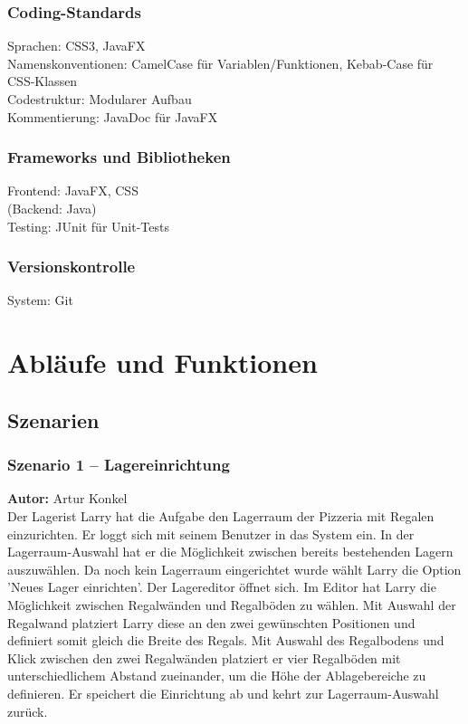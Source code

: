 \subsubsection*{Coding-Standards}
Sprachen: CSS3, JavaFX\\
Namenskonventionen: CamelCase für Variablen/Funktionen, Kebab-Case für CSS-Klassen\\
Codestruktur: Modularer Aufbau\\
Kommentierung: JavaDoc für JavaFX

\subsubsection*{Frameworks und Bibliotheken}
Frontend: JavaFX, CSS\\
(Backend: Java)\\
Testing: JUnit für Unit-Tests

\subsubsection*{Versionskontrolle}
System: Git

\section{Abläufe und Funktionen}

\subsection{Szenarien}

\subsubsection{Szenario 1 – Lagereinrichtung}
\textbf{Autor:} Artur Konkel\\
Der Lagerist Larry hat die Aufgabe den Lagerraum der Pizzeria mit Regalen einzurichten. Er loggt sich mit seinem
Benutzer in das System ein. In der Lagerraum-Auswahl hat er die Möglichkeit zwischen bereits bestehenden Lagern
auszuwählen. Da noch kein Lagerraum eingerichtet wurde wählt Larry die Option 'Neues Lager einrichten'. Der
Lagereditor öffnet sich. Im Editor hat Larry die Möglichkeit zwischen Regalwänden und Regalböden zu wählen. Mit
Auswahl der Regalwand platziert Larry diese an den zwei gewünschten Positionen und definiert somit gleich die Breite
des Regals. Mit Auswahl des Regalbodens und Klick zwischen den zwei Regalwänden platziert er vier Regalböden mit
unterschiedlichem Abstand zueinander, um die Höhe der Ablagebereiche zu definieren. Er speichert die Einrichtung ab
und kehrt zur Lagerraum-Auswahl zurück.

